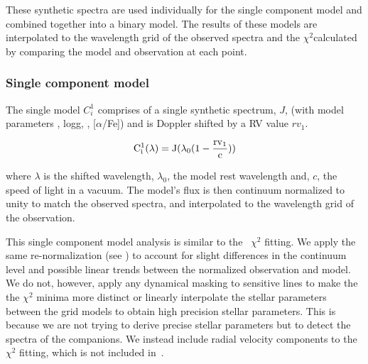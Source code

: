 These synthetic spectra are used individually for the single component model and combined together into a binary model. The results of these models are interpolated to the wavelength grid of the observed spectra and the \(\chi^{2}\)calculated by comparing the model and observation at each point.


\subsubsection{Single component model}
\label{subsubsec:single-model}
The single model \(C^{1}_{i}\) comprises of a single synthetic spectrum, \(J\), (with model parameters \teff{}, logg, \feh{}, [\(\alpha\)/Fe]) and is Doppler shifted by a {RV} value \({rv}_1\).

\begin{equation}
\rm C^{1}_{i}(\lambda) = J(\lambda_0(1-\frac{{rv}_1}{c}))
\end{equation}

where \(\lambda\) is the shifted wavelength, \(\lambda_0\), the model rest wavelength and, \(c\), the speed of light in a vacuum. The model's flux is then continuum normalized to unity to match the observed spectra, and interpolated to the wavelength grid of the observation.

This single component model analysis is similar to the~\citet{passegger_fundamental_2016} \(\chi^2\) fitting. We apply the same re-normalization (see ) to account for slight differences in the continuum level and possible linear trends between the normalized observation and model. We do not, however, apply any dynamical masking to sensitive lines to make the the \(\chi^2\) minima more distinct or linearly interpolate the stellar parameters between the grid models to obtain high precision stellar parameters. This is because we are not trying to derive precise stellar parameters but to detect the spectra of the companions. We instead include radial velocity components to the \(\chi^2\) fitting, which is not included in~\citet{passegger_fundamental_2016}.


